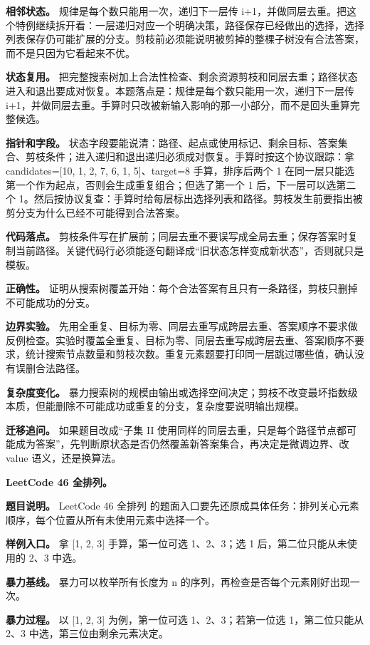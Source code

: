 \textbf{相邻状态。} 规律是每个数只能用一次，递归下一层传 i+1，并做同层去重。把这个特例继续拆开看：一层递归对应一个明确决策，路径保存已经做出的选择，选择列表保存仍可能扩展的分支。剪枝前必须能说明被剪掉的整棵子树没有合法答案，而不是只因为它看起来不优。

\textbf{状态复用。} 把完整搜索树加上合法性检查、剩余资源剪枝和同层去重；路径状态进入和退出要成对恢复。本题落点是：规律是每个数只能用一次，递归下一层传 i+1，并做同层去重。手算时只改被新输入影响的那一小部分，而不是回头重算完整候选。

\textbf{指针和字段。} 状态字段要能说清：路径、起点或使用标记、剩余目标、答案集合、剪枝条件；进入递归和退出递归必须成对恢复。手算时按这个协议跟踪：拿 candidates=[10, 1, 2, 7, 6, 1, 5]、target=8 手算，排序后两个 1 在同一层只能选第一个作为起点，否则会生成重复组合；但选了第一个 1 后，下一层可以选第二个 1。然后按协议复查：手算时给每层标出选择列表和路径。剪枝发生前要指出被剪分支为什么已经不可能得到合法答案。

\textbf{代码落点。} 剪枝条件写在扩展前；同层去重不要误写成全局去重；保存答案时复制当前路径。关键代码行必须能逐句翻译成“旧状态怎样变成新状态”，否则就只是模板。

\textbf{正确性。} 证明从搜索树覆盖开始：每个合法答案有且只有一条路径，剪枝只删掉不可能成功的分支。

\textbf{边界实验。} 先用全重复、目标为零、同层去重写成跨层去重、答案顺序不要求做反例检查。实验时覆盖全重复、目标为零、同层去重写成跨层去重、答案顺序不要求，统计搜索节点数量和剪枝次数。重复元素题要打印同一层跳过哪些值，确认没有误删合法路径。

\textbf{复杂度变化。} 暴力搜索树的规模由输出或选择空间决定；剪枝不改变最坏指数级本质，但能删除不可能成功或重复的分支，复杂度要说明输出规模。

\textbf{迁移追问。} 如果题目改成“子集 II 使用同样的同层去重，只是每个路径节点都可能成为答案”，先判断原状态是否仍然覆盖新答案集合，再决定是微调边界、改 value 语义，还是换算法。

\noindent\textbf{LeetCode 46 全排列。}

\textbf{题目说明。} LeetCode 46 全排列 的题面入口要先还原成具体任务：排列关心元素顺序，每个位置从所有未使用元素中选择一个。

\textbf{样例入口。} 拿 [1, 2, 3] 手算，第一位可选 1、2、3；选 1 后，第二位只能从未使用的 2、3 中选。

\textbf{暴力基线。} 暴力可以枚举所有长度为 n 的序列，再检查是否每个元素刚好出现一次。

\textbf{暴力过程。} 以 [1, 2, 3] 为例，第一位可选 1、2、3；若第一位选 1，第二位只能从 2、3 中选，第三位由剩余元素决定。

